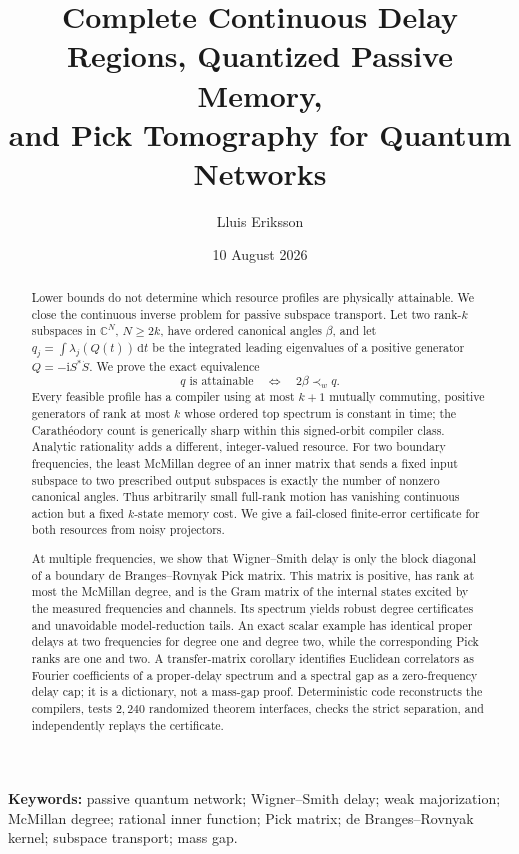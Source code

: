 \documentclass[11pt]{article}
\title{Complete Continuous Delay Regions, Quantized Passive Memory,\\
and Pick Tomography for Quantum Networks}
\author{Lluis Eriksson}
\date{10 August 2026}
\theoremstyle{definition}
\theoremstyle{remark}
\newcommand{\C}{\mathbb C}
\newcommand{\dd}{\mathrm d}
\begin{document}
\maketitle

\begin{abstract}
Lower bounds do not determine which resource profiles are physically
attainable.  We close the continuous inverse problem for passive subspace transport.
Let two rank-$k$ subspaces in $\C^N$, $N\geq2k$, have ordered canonical
angles $\beta$, and let
$q_j=\int\lambda_j(Q(t))\,\dd t$ be the integrated leading eigenvalues of a
positive generator $Q=-\mathrm iS^*\dot S$.  We prove the exact equivalence
\[
 q\text{ is attainable}\quad\Longleftrightarrow\quad 2\beta\prec_w q.
\]
Every feasible profile has a compiler using at most $k+1$ mutually commuting,
positive generators of rank at most $k$ whose ordered top spectrum is constant
in time;
the Carath\'eodory count is generically sharp within this signed-orbit
compiler class.  Analytic rationality adds a
different, integer-valued resource.  For two boundary frequencies, the least
McMillan degree of an inner matrix that sends a fixed input subspace to two
prescribed output subspaces is exactly the number of nonzero canonical
angles.  Thus arbitrarily small full-rank motion has vanishing continuous
action but a fixed $k$-state memory cost.  We give a fail-closed finite-error
certificate for both resources from noisy projectors.

At multiple frequencies, we show that Wigner--Smith delay is only the
block diagonal of a boundary de Branges--Rovnyak Pick matrix.  This matrix is
positive, has rank at most the McMillan degree, and is the Gram matrix of the
internal states excited by the measured frequencies and channels.  Its
spectrum yields robust degree certificates and unavoidable model-reduction
tails.  An exact scalar example has identical proper delays at two frequencies
for degree one and degree two, while the corresponding Pick ranks are one and
two.  A transfer-matrix corollary identifies Euclidean correlators as Fourier
coefficients of a proper-delay spectrum and a spectral gap as a zero-frequency
delay cap; it is a dictionary, not a mass-gap proof.  Deterministic code
reconstructs the compilers, tests $2{,}240$ randomized theorem interfaces,
checks the strict separation, and independently replays the certificate.
\end{abstract}

\noindent\textbf{Keywords:} passive quantum network; Wigner--Smith delay;
weak majorization; McMillan degree; rational inner function; Pick matrix;
de Branges--Rovnyak kernel; subspace transport; mass gap.
\end{document}
